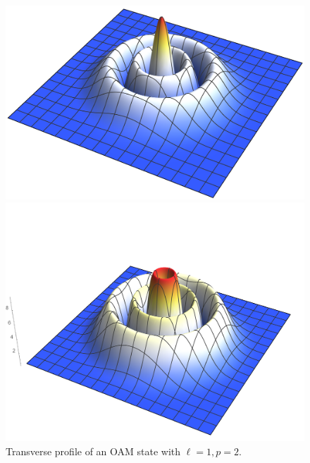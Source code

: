 \begin{figure}
    \centering
    \begin{minipage}{0.45\textwidth}
        \centering
        \includegraphics[width=1\textwidth]{Figures/OAM/LGBeamProfile_L0P2Z03.png} %
        \caption{
        	Transverse profile of an OAM state with $\ell=0, p=2$.
        }
        \label{fig:expQWs:LG_profile_L0P2Z03}
    \end{minipage}\hfill
    \begin{minipage}{0.45\textwidth}
        \centering
        \vspace{-30pt}%
        \includegraphics[width=1\textwidth]{Figures/OAM/LGBeamProfile_L1P2Z03.png} %
        \caption{
        	Transverse profile of an OAM state with $\ell=1, p=2$.
        }
        \label{fig:expQWs:LG_profile_L1P2Z03}
    \end{minipage}
\end{figure}

